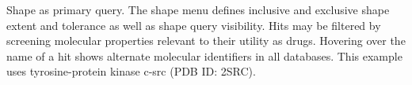 \label{shapefig} Shape as primary query. The shape menu defines inclusive and exclusive shape extent and tolerance as well as shape query visibility. Hits may be filtered by screening molecular properties relevant to their utility as drugs. Hovering over the name of a hit shows alternate molecular identifiers in all databases. This example uses tyrosine-protein kinase c-src (PDB ID: 2SRC).